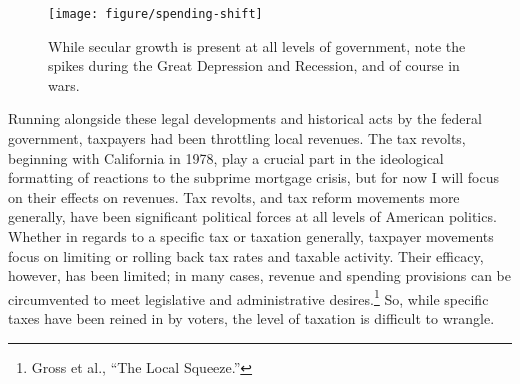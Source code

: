 \documentclass[
]{article}
\let\rmarkdownfootnote\footnote%
\def\footnote{\protect\rmarkdownfootnote}
\begin{document}
\begin{figure}

{\centering \texttt{[image: figure/spending-shift]} 

}

\caption{While secular growth is present at all levels of government, note the spikes during the Great Depression and Recession, and of course in wars.}\label{fig:spending-shift}
\end{figure}

Running alongside these legal developments and historical acts by the
federal government, taxpayers had been throttling local revenues. The
tax revolts, beginning with California in 1978, play a crucial part in
the ideological formatting of reactions to the subprime mortgage crisis,
but for now I will focus on their effects on revenues. Tax revolts, and
tax reform movements more generally, have been significant political
forces at all levels of American politics. Whether in regards to a
specific tax or taxation generally, taxpayer movements focus on limiting
or rolling back tax rates and taxable activity. Their efficacy, however,
has been limited; in many cases, revenue and spending provisions can be
circumvented to meet legislative and administrative desires.\footnote{Gross
  et al., ``The Local Squeeze.''} So, while specific taxes have been
reined in by voters, the level of taxation is difficult to wrangle.
\end{document}
